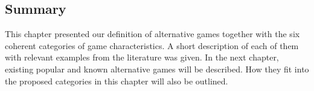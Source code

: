 \documentclass[../Main.tex]{subfiles}
\begin{document}
\subsection{Summary}
This chapter presented our definition of alternative games together with the six coherent categories of game characteristics. A short description of each of them with relevant examples from the literature was given. In the next chapter, existing popular and known alternative games will be described. How they fit into the proposed categories in this chapter will also be outlined.

\biblio %
\end{document}
